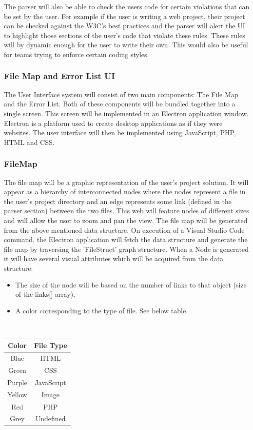 \documentclass[letterpaper,10pt,titlepage,draftclsnofoot,onecolumn,onesided] {IEEEtran}
\begin{document}
The parser will also be able to check the users code for certain violations that can be set by the user.
For example if the user is writing a web project, their project can be checked against the W3C's best practices and the parser will alert the UI to highlight those sections of the user's code that violate these rules.
These rules will by dynamic enough for the user to write their own.
This would also be useful for teams trying to enforce certain coding styles.\cite{w3c}
	
\subsubsection{File Map and Error List UI}
The User Interface system will consist of two main components: The File Map and the Error List. 	
Both of these components will be bundled together into a single screen. 
This screen will be implemented in an Electron application window. 
Electron is a platform used to create desktop applications as if they were websites. \cite{Electron}
The user interface will then be implemented using JavaScript, PHP, HTML and CSS.
	
\subsubsection{FileMap}
The file map will be a graphic representation of the user's project solution. 
It will appear as a hierarchy of interconnected nodes where the nodes represent a file in the user's project directory and an edge represents some link (defined in the parser section) between the two files. 
This web will feature nodes of different sizes and will allow the user to zoom and pan the view.
The file map will be generated from the above mentioned data structure. 
On execution of a Visual Studio Code command, the Electron application will fetch the data structure and generate the file map by traversing the 'FileStruct' graph structure.
When a Node is generated it will have several visual attributes which will be acquired from the data structure:
\begin{itemize}
	\item The size of the node will be based on the number of links to that object (size of the links[] array). 
	\item A color corresponding to the type of file. See below table.
\end{itemize}
\hfill \\
\begin{tabular}{| c | c |}
	\hline
	Color & File Type\\
	\hline
	Blue & HTML\\
	Green & CSS\\
	Purple & JavaScript\\
	Yellow & Image\\
	Red & PHP\\
	Grey & Undefined\\
	\hline
\end{tabular}
	
\end{document}
